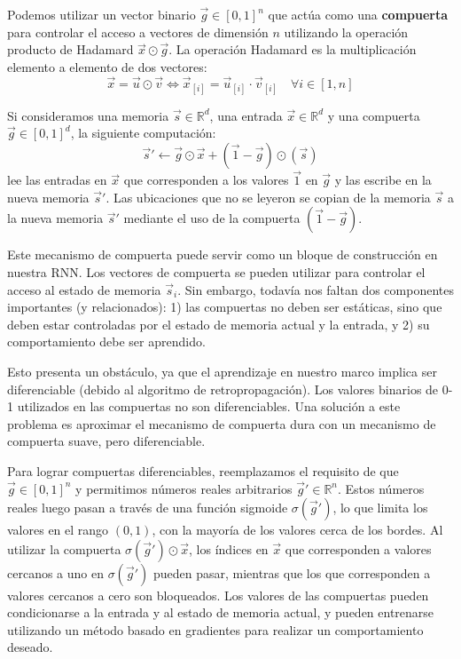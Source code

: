 Podemos utilizar un vector binario $\vec{g} \in [0,1]^n$ que actúa como una \textbf{compuerta} para controlar el acceso a vectores de dimensión $n$ utilizando la operación producto de Hadamard $\vec{x} \odot \vec{g}$. La operación Hadamard es la multiplicación elemento a elemento de dos vectores:
\begin{displaymath}
\vec{x} = \vec{u} \odot \vec{v}  \Leftrightarrow  \vec{x}_{[i]} = \vec{u}_{[i]} \cdot \vec{v}_{[i]} \quad \forall i \in [1,n]
\end{displaymath}

Si consideramos una memoria $\vec{s} \in \mathbb{R}^{d}$, una entrada $\vec{x} \in \mathbb{R}^{d}$ y una compuerta $\vec{g} \in [0,1]^{d}$, la siguiente computación:
\begin{displaymath}
\vec{s}' \leftarrow \vec{g} \odot \vec{x} + (\vec{1}-\vec{g}) \odot (\vec{s})
\end{displaymath}
lee las entradas en $\vec{x}$ que corresponden a los valores $\vec{1}$ en $\vec{g}$ y las escribe en la nueva memoria $\vec{s}'$. Las ubicaciones que no se leyeron se copian de la memoria $\vec{s}$ a la nueva memoria $\vec{s}'$ mediante el uso de la compuerta $(\vec{1}-\vec{g})$.

Este mecanismo de compuerta puede servir como un bloque de construcción en nuestra RNN. Los vectores de compuerta se pueden utilizar para controlar el acceso al estado de memoria $\vec{s}_i$. Sin embargo, todavía nos faltan dos componentes importantes (y relacionados): 1) las compuertas no deben ser estáticas, sino que deben estar controladas por el estado de memoria actual y la entrada, y 2) su comportamiento debe ser aprendido.

Esto presenta un obstáculo, ya que el aprendizaje en nuestro marco implica ser diferenciable (debido al algoritmo de retropropagación). Los valores binarios de 0-1 utilizados en las compuertas no son diferenciables. Una solución a este problema es aproximar el mecanismo de compuerta dura con un mecanismo de compuerta suave, pero diferenciable.

Para lograr compuertas diferenciables, reemplazamos el requisito de que $\vec{g} \in [0,1]^n$ y permitimos números reales arbitrarios $\vec{g}' \in \mathbb{R}^n$. Estos números reales luego pasan a través de una función sigmoide $\sigma(\vec{g}')$, lo que limita los valores en el rango $(0,1)$, con la mayoría de los valores cerca de los bordes. Al utilizar la compuerta $\sigma(\vec{g}')\odot \vec{x}$, los índices en $\vec{x}$ que corresponden a valores cercanos a uno en $\sigma(\vec{g}')$ pueden pasar, mientras que los que corresponden a valores cercanos a cero son bloqueados. Los valores de las compuertas pueden condicionarse a la entrada y al estado de memoria actual, y pueden entrenarse utilizando un método basado en gradientes para realizar un comportamiento deseado.

